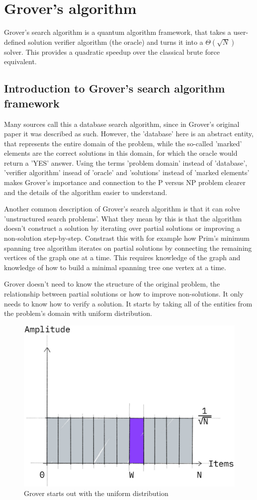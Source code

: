 \chapter{Grover's algorithm}

Grover's search algorithm\cite{GroverOriginal} is a quantum algorithm framework, that takes a user-defined solution verifier algorithm (the oracle) and turns it into a $\Theta(\sqrt{N})$\cite{bennett_strengths_1997} solver. This provides a quadratic speedup over the classical brute force equivalent.

\section{Introduction to Grover's search algorithm framework}

Many sources call this a database search algorithm, since in Grover's original paper it was described as such. However, the 'database' here is an abstract entity, that represents the entire domain of the problem, while the so-called 'marked' elements are the correct solutions in this domain, for which the oracle would return a 'YES' answer. Using the terms 'problem domain' instead of 'database', 'verifier algorithm' insead of 'oracle' and 'solutions' instead of 'marked elements' makes Grover's importance and connection to the P versus NP problem clearer and the details of the algorithm easier to understand.

Another common description of Grover's search algorithm is that it can solve 'unstructured search problems'. What they mean by this is that the algorithm doesn't construct a solution by iterating over partial solutions or improving a non-solution step-by-step. Constrast this with for example how Prim's minimum spanning tree algorithm iterates on partial solutions by connecting the remaining vertices of the graph one at a time. This requires knowledge of the graph and knowledge of how to build a minimal spanning tree one vertex at a time.

Grover doesn't need to know the structure of the original problem, the relationship between partial solutions or how to improve non-solutions. It only needs to know how to verify a solution. It starts by taking all of the entities from the problem's domain with uniform distribution.

\begin{figure}[H]
    \centering
    \includegraphics[width=0.5\linewidth]{content/assets/03_grovers_algorithm/grover_uniform.jpg}
    \caption{Grover starts out with the uniform distribution\cite{GroverQiskitTextbook}}
\end{figure}

